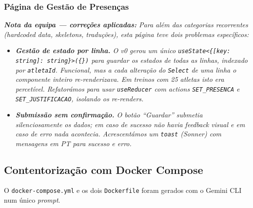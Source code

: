 \subsubsection*{Página de Gestão de Presenças}


\noindent\textit{\textbf{Nota da equipa --- correções aplicadas:} Para além das categorias recorrentes (\textit{hardcoded data}, \textit{skeletons}, traduções), esta página teve dois problemas específicos:}
\begin{itemize}
    \item \textit{\textbf{Gestão de estado por linha.} O v0 gerou um único \texttt{useState<\{[key: string]: string\}>(\{\})} para guardar os estados de todas as linhas, indexado por \texttt{atletaId}. Funcional, mas a cada alteração do \texttt{Select} de uma linha o componente inteiro re-renderizava. Em treinos com 25 atletas isto era percetível. Refatorámos para usar \texttt{useReducer} com \textit{actions} \texttt{SET\_PRESENCA} e \texttt{SET\_JUSTIFICACAO}, isolando os \textit{re-renders}.}
    \item \textit{\textbf{Submissão sem confirmação.} O botão ``Guardar'' submetia silenciosamente os dados; em caso de sucesso não havia \textit{feedback} visual e em caso de erro nada acontecia. Acrescentámos um \texttt{toast} (Sonner) com mensagens em PT para sucesso e erro.}
\end{itemize}

\subsection{Contentorização com Docker Compose}\label{subsec:ia_impl_docker}

O \texttt{docker-compose.yml} e os dois \texttt{Dockerfile} foram gerados com o Gemini CLI num único \textit{prompt}.

